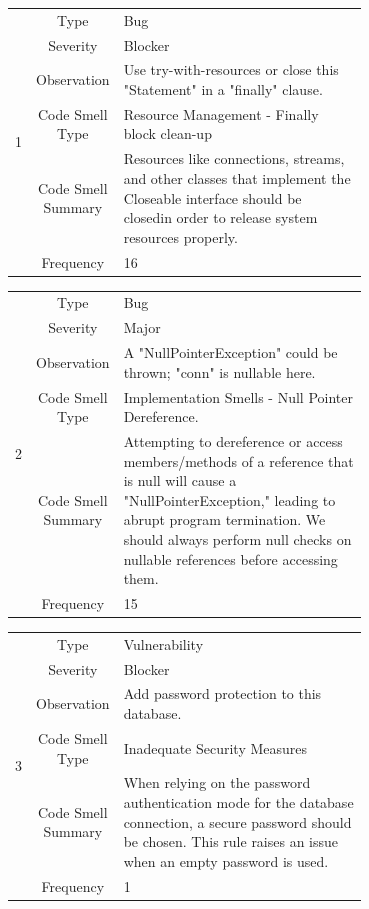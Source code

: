 \documentclass[12pt,letterpaper]{report}
\begin{document}
\begin{table}[h!]
    \begin{tabular}{|c|c|p{0.7\linewidth}|}
    \hline   
    \multirow{6}{*}{1}
        & Type & Bug \\
    \cline{2-3}
        & Severity & Blocker \\
    \cline{2-3}
       & Observation & Use try-with-resources or close this "Statement" in a "finally" clause. \\
    \cline{2-3}
       & Code Smell Type &  Resource Management - Finally block clean-up\\
    \cline{2-3}
       & Code Smell Summary & Resources like connections, streams, and other classes that implement the Closeable interface should be closedin order to release system resources properly.  \\
    \cline{2-3}
       & Frequency & 16 \\
    \hline
    \end{tabular}
\end{table}


\begin{table} 
    \begin{tabular}{|c|c|p{0.7\linewidth}|}
    \hline   
    \multirow{6}{*}{2}
        & Type & Bug \\
    \cline{2-3}
        & Severity & Major \\
    \cline{2-3}
       & Observation & A "NullPointerException" could be thrown; "conn" is nullable here. \\
    \cline{2-3}
       & Code Smell Type &  Implementation Smells - Null Pointer Dereference.\\
    \cline{2-3}
       & Code Smell Summary & Attempting to dereference or access members/methods of a reference that is null will cause a "NullPointerException," leading to abrupt program termination. We should always perform null checks on nullable references before accessing them. \\
    \cline{2-3}
       & Frequency & 15 \\
    \hline
    \end{tabular}
\end{table}


\begin{table}
    \begin{tabular}{|c|c|p{0.7\linewidth}|}
    \hline   
    \multirow{6}{*}{3}
        & Type & Vulnerability \\
    \cline{2-3}
        & Severity & Blocker \\
    \cline{2-3}
       & Observation & Add password protection to this database. \\
    \cline{2-3}
       & Code Smell Type &  Inadequate Security Measures\\
    \cline{2-3}
       & Code Smell Summary & When relying on the password authentication mode for the database connection, a secure password should be chosen. This rule raises an issue when an empty password is used. \\
    \cline{2-3}
       & Frequency & 1 \\
    \hline
    \end{tabular}
\end{table}
\end{document}
